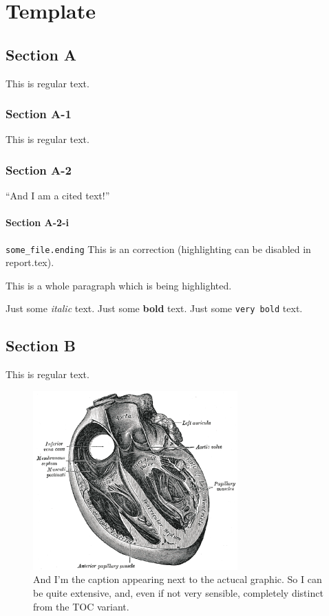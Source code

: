 \chapter{Template}\label{ch:template}


\section{Section A}%
This is regular text.

\subsection{Section A-1}
This is regular text.

\subsection{Section A-2}
\enquote{And I am a cited text!}\parencite[vgl.][S. 152]{sousa_new_2005}

\subsubsection{Section A-2-i}
\verb|some_file.ending|
This is an  correction (highlighting can be disabled in report.tex).

\begin{mccorrection}
    This is a whole paragraph which is being highlighted.
\end{mccorrection}

Just some \textit{italic} text.
Just some \textbf{bold} text.
Just some \texttt{very bold} text.

\section{Section B}%
This is regular text.

\begin{figure}
    \centering
    \includegraphics[width=0.7\textwidth]{content/figures/sample/Gray498}
    \caption[I'm the short title for the TOC]{And I'm the caption appearing next to the actucal graphic. So I can be quite extensive, and, even if not very sensible, completely distinct from the TOC variant.}
    \label{fig:heart}
\end{figure}

